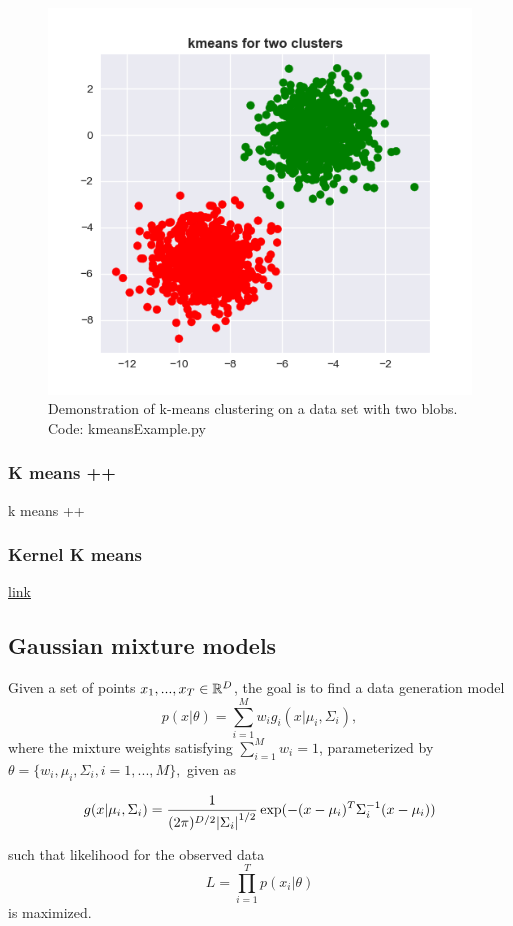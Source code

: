 \begin{refsection}
\begin{figure}
\centering
\includegraphics[width=0.5\linewidth]{../figures/statisticalLearning/unsupervisedLearning/kmeansExample}
\caption{Demonstration of k-means clustering on a data set with two blobs. Code: kmeansExample.py}
\label{fig:kmeansExample}
\end{figure}


\subsubsection{K means ++}

k means ++ 

\subsubsection{Kernel K means}

\href{https://sites.google.com/site/dataclusteringalgorithms/kernel-k-means-clustering-algorithm}{link}

\subsection{Gaussian mixture models}

\begin{definition}
Given a set of points $x_1,...,x_T \in \mathbb{R}^D$, the goal is to find a data generation model 
$$p(x|\theta) = \sum_{i=1}^M w_i g_i(x|\mu_i,\Sigma_i),$$ where the mixture weights satisfying $\sum_{i=1}^M w_i = 1$,
parameterized by $\theta=\{w_i,\mu_i, \Sigma_i,i=1,...,M\},$ given as 

	$$g(x|\mu_i,\Sigma_i) = \frac{1}{(2\pi)^{D/2}\abs{ \Sigma_i}^{1/2}}\exp(-(x-\mu_i)^T\Sigma_i^{-1}(x-\mu_i))$$

such that likelihood for the observed data
$$L = \prod_{i=1}^T p(x_i|\theta)$$
is maximized.
\end{definition}



\end{refsection}
